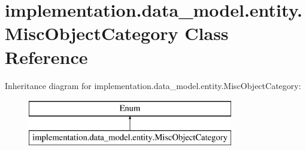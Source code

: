 \hypertarget{classimplementation_1_1data__model_1_1entity_1_1_misc_object_category}{}\section{implementation.\+data\+\_\+model.\+entity.\+Misc\+Object\+Category Class Reference}
\label{classimplementation_1_1data__model_1_1entity_1_1_misc_object_category}
Inheritance diagram for implementation.\+data\+\_\+model.\+entity.\+Misc\+Object\+Category\+:\begin{figure}[H]
\begin{center}
\leavevmode
\includegraphics[height=2.000000cm]{classimplementation_1_1data__model_1_1entity_1_1_misc_object_category}
\end{center}
\end{figure}
